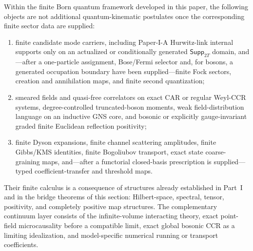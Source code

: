 \documentclass[12pt,a4paper]{article}
\begin{document}
\begin{proposition}
\label{p4:prop:native-qft-status}
Within the finite Born quantum framework developed in this paper, the following objects are not additional quantum-kinematic postulates once the corresponding finite sector data are supplied:
\begin{enumerate}
\item finite candidate mode carriers, including Paper-I-A Hurwitz-link internal
supports only on an actualized or conditionally generated
\(\mathsf{Supp}_{2T}\) domain, and---after a
one-particle assignment, Bose/Fermi selector and, for bosons, a generated occupation boundary have been
supplied---finite Fock
sectors, creation and annihilation maps, and finite second quantization;
\item smeared fields and quasi-free correlators on exact CAR or regular
Weyl-CCR systems, degree-controlled truncated-boson moments, weak
field-distribution language on an inductive GNS core, and bosonic or
explicitly gauge-invariant graded finite Euclidean reflection positivity;
\item finite Dyson expansions, finite channel scattering amplitudes, finite
Gibbs/KMS identities, finite Bogoliubov transport, exact state
coarse-graining maps, and---after a functorial closed-basis prescription is
supplied---typed coefficient-transfer and threshold maps.
\end{enumerate}
Their finite calculus is a consequence of structures already established in Part~I and in
the bridge theorems of this section: Hilbert-space, spectral, tensor,
positivity, and completely positive map structures.  The complementary continuum layer consists of the infinite-volume interacting theory, exact point-field microcausality before a compatible limit, exact global bosonic CCR as a limiting idealization, and model-specific numerical running or transport coefficients.
\end{proposition}
\end{document}
